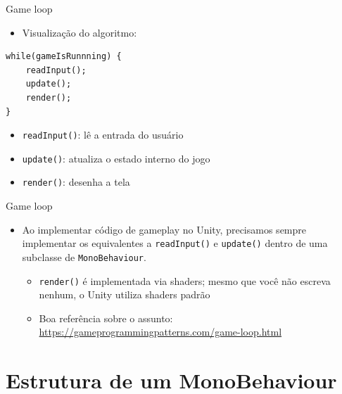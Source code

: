 \documentclass{beamer}
\begin{document}
\begin{frame}[fragile]{Game loop}
	\begin{itemize}
		\item Visualização do algoritmo:
	\end{itemize}		
	\begin{lstlisting}
while(gameIsRunnning) {
	readInput();
	update();
	render();
}
\end{lstlisting}
	\begin{itemize}
		\item \verb|readInput()|: lê a entrada do usuário
		\item \verb|update()|: atualiza o estado interno do jogo
		\item \verb|render()|: desenha a tela
	\end{itemize}
\end{frame}

\begin{frame}[fragile]{Game loop}
%	
	\begin{itemize}
		\item Ao implementar código de gameplay no Unity, precisamos sempre implementar os equivalentes a \verb|readInput()| e \verb|update()| dentro de uma subclasse de \verb|MonoBehaviour|.
		\begin{itemize}
			\item \verb|render()| é implementada via shaders; mesmo que você não escreva nenhum, o Unity utiliza shaders padrão
		\end{itemize}
	\begin{itemize}
		\item Boa referência sobre o assunto: \url{https://gameprogrammingpatterns.com/game-loop.html}
	\end{itemize}
	\end{itemize}
\end{frame}

\section{Estrutura de um MonoBehaviour}
\end{document}
